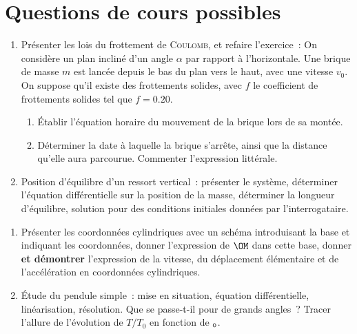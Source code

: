 \documentclass[a4paper, 12pt, final, garamond]{book}
\begin{document}
\newpage
\section{Questions de cours possibles}
\begin{enumerate}
	\item Présenter les lois du frottement de \textsc{Coulomb}, et refaire
	      l'exercice~:
	      \smallbreak
	      On considère un plan incliné d'un angle $\alpha$ par
	      rapport à l'horizontale. Une brique de masse $m$ est
	      lancée depuis le bas du plan vers le haut, avec une vitesse $v_0$.
	      On suppose qu'il existe des frottements solides,
	      avec $f$ le coefficient de frottements solides tel que $f =
		      \num{0.20}$.
	      \begin{enumerate}[label=\sqenumi]
		      \item Établir l'équation horaire du mouvement de la brique lors de
		            sa montée.
		      \item Déterminer la date à laquelle la brique s'arrête, ainsi que la
		            distance qu'elle aura parcourue. Commenter l'expression littérale.
	      \end{enumerate}
	\item Position d'équilibre d'un ressort vertical~: présenter le système,
	      déterminer l'équation différentielle sur la position de la masse,
	      déterminer la longueur d'équilibre, solution pour des conditions
	      initiales données par l'interrogataire.
\end{enumerate}

\begin{enumerate}[resume]
	\item Présenter les coordonnées cylindriques avec un schéma introduisant la
	      base et indiquant les coordonnées, donner l'expression de $\OM$ dans
	      cette base, donner \textbf{et démontrer} l'expression de la vitesse, du
	      déplacement élémentaire et de l'accélération en coordonnées cylindriques.
	\item Étude du pendule simple~: mise en situation, équation différentielle,
	      linéarisation, résolution. Que se passe-t-il pour de grands angles~? Tracer
	      l'allure de l'évolution de $T/T_0$ en fonction de $\tt_0$.
\end{enumerate}
\end{document}

